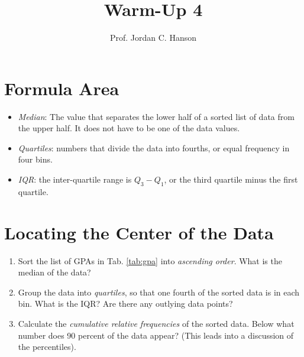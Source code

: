 \documentclass{article}
\begin{document}
\title{Warm-Up 4}
\author{Prof. Jordan C. Hanson}

\maketitle

\section{Formula Area}

\begin{itemize}
\item \textit{Median}: The value that separates the lower half of a sorted list of data from the upper half.  It does not have to be one of the data values.
\item \textit{Quartiles}: numbers that divide the data into fourths, or equal frequency in four bins.
\item \textit{IQR}: the inter-quartile range is $Q_3 - Q_1$, or the third quartile minus the first quartile.
\end{itemize}

\section{Locating the Center of the Data}

\begin{enumerate}
\item Sort the list of GPAs in Tab. \ref{tab:gpa} into \textit{ascending order}. What is the median of the data? \\ \vspace{2cm}
\item Group the data into \textit{quartiles}, so that one fourth of the sorted data is in each bin.  What is the IQR?  Are there any outlying data points? \\ \vspace{2cm}
\item Calculate the \textit{cumulative relative frequencies} of the sorted data.  Below what number does 90 percent of the data appear? (This leads into a discussion of the percentiles).
\end{enumerate}
\end{document}
